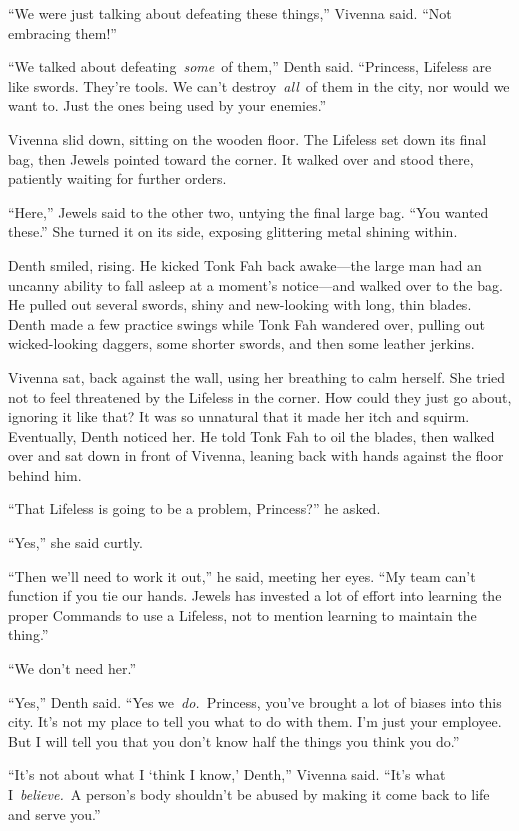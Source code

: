 “We were just talking about defeating these things,” Vivenna said. “Not embracing them!”

“We talked about defeating~\textit{some}~of them,” Denth said. “Princess, Lifeless are like swords. They’re tools. We can’t destroy~\textit{all}~of them in the city, nor would we want to. Just the ones being used by your enemies.”

Vivenna slid down, sitting on the wooden floor. The Lifeless set down its final bag, then Jewels pointed toward the corner. It walked over and stood there, patiently waiting for further orders.

“Here,” Jewels said to the other two, untying the final large bag. “You wanted these.” She turned it on its side, exposing glittering metal shining within.

Denth smiled, rising. He kicked Tonk Fah back awake—the large man had an uncanny ability to fall asleep at a moment’s notice—and walked over to the bag. He pulled out several swords, shiny and new-looking with long, thin blades. Denth made a few practice swings while Tonk Fah wandered over, pulling out wicked-looking daggers, some shorter swords, and then some leather jerkins.

Vivenna sat, back against the wall, using her breathing to calm herself. She tried not to feel threatened by the Lifeless in the corner. How could they just go about, ignoring it like that? It was so unnatural that it made her itch and squirm. Eventually, Denth noticed her. He told Tonk Fah to oil the blades, then walked over and sat down in front of Vivenna, leaning back with hands against the floor behind him.

“That Lifeless is going to be a problem, Princess?” he asked.

“Yes,” she said curtly.

“Then we’ll need to work it out,” he said, meeting her eyes. “My team can’t function if you tie our hands. Jewels has invested a lot of effort into learning the proper Commands to use a Lifeless, not to mention learning to maintain the thing.”

“We don’t need her.”

“Yes,” Denth said. “Yes we~\textit{do.}~Princess, you’ve brought a lot of biases into this city. It’s not my place to tell you what to do with them. I’m just your employee. But I will tell you that you don’t know half the things you think you do.”

“It’s not about what I ‘think I know,’ Denth,” Vivenna said. “It’s what I~\textit{believe.}~A person’s body shouldn’t be abused by making it come back to life and serve you.”

